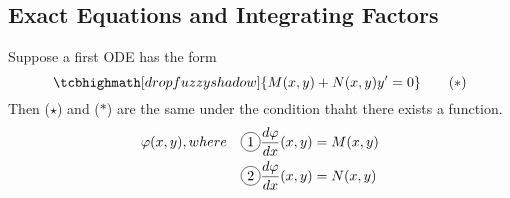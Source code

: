 \subsection*{Exact Equations and Integrating Factors}
Suppose a first ODE has the form
\begin{equation*}
	\tcbhighmath[drop fuzzy shadow]{M(x,y) + N(x,y)y' = 0} \tag{$\ast$}
\end{equation*}
Then ($\star$) and ($\ast$) are the same under the condition thaht there exists a function.
\begin{align}
		\varphi(x,y), where \quad & \circled{1} \dfrac{d \varphi}{dx} (x,y) = M(x,y)\\
		& \circled{2} \dfrac{d \varphi}{dx} (x,y) = N(x,y)
\end{align}


